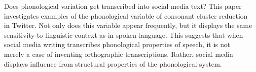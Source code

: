 Does phonological variation get transcribed into social media text?   This paper investigates examples of the phonological variable of
   consonant cluster reduction in Twitter. Not only does this variable
   appear frequently, but it displays the same sensitivity to
   linguistic context as in spoken language. This suggests that when
   social media writing transcribes phonological properties of speech,
   it is not merely a case of inventing orthographic transcriptions.
   Rather, social media displays influence from structural properties
   of the phonological system.

